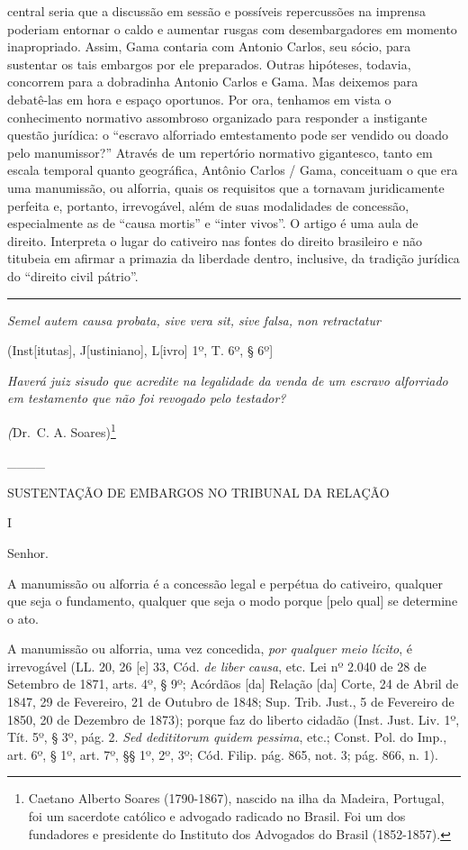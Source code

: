 {central seria que a discussão em sessão e possíveis repercussões na
imprensa poderiam entornar o caldo e aumentar rusgas com desembargadores
em momento inapropriado. Assim, Gama contaria com Antonio Carlos, seu
sócio, para sustentar os tais embargos por ele preparados. Outras
hipóteses, todavia, concorrem para a dobradinha Antonio Carlos e Gama.
Mas deixemos para debatê-las em hora e espaço oportunos. Por ora,
tenhamos em vista o conhecimento normativo assombroso organizado para
responder a instigante questão jurídica: o ``escravo alforriado
emtestamento pode ser vendido ou doado pelo manumissor?'' Através de um
repertório normativo gigantesco, tanto em escala temporal quanto
geográfica, Antônio Carlos / Gama, conceituam o que era uma manumissão,
ou alforria, quais os requisitos que a tornavam juridicamente perfeita
e, portanto, irrevogável, além de suas modalidades de concessão,
especialmente as de ``causa mortis'' e ``inter vivos''. O artigo é uma
aula de direito. Interpreta o lugar do cativeiro nas fontes do direito
brasileiro e não titubeia em afirmar a primazia da liberdade dentro,
inclusive, da tradição jurídica do ``direito civil pátrio''. }

\begin{center}\rule{0.5\linewidth}{\linethickness}\end{center}

\emph{Semel autem causa probata, sive vera sit, sive falsa, non
retractatur}

(Inst{[}itutas{]}, J{[}ustiniano{]}, L{[}ivro{]} 1º, T. 6º, § 6º{]}

\emph{Haverá juiz sisudo que acredite na legalidade da venda de um
escravo alforriado em testamento que não foi revogado pelo testador?}

\emph{(}Dr.~C. A. Soares)\footnote{Caetano Alberto Soares (1790-1867),
  nascido na ilha da Madeira, Portugal, foi um sacerdote católico e
  advogado radicado no Brasil. Foi um dos fundadores e presidente do
  Instituto dos Advogados do Brasil (1852-1857).}

\_\_\_\_

SUSTENTAÇÃO DE EMBARGOS NO TRIBUNAL DA RELAÇÃO

I

Senhor.

A manumissão ou alforria é a concessão legal e perpétua do cativeiro,
qualquer que seja o fundamento, qualquer que seja o modo porque {[}pelo
qual{]} se determine o ato.

A manumissão ou alforria, uma vez concedida, \emph{por qualquer meio
lícito}, é irrevogável (LL. 20, 26 {[}e{]} 33, Cód. \emph{de liber
causa}, etc. Lei nº 2.040 de 28 de Setembro de 1871, arts. 4º, § 9º;
Acórdãos {[}da{]} Relação {[}da{]} Corte, 24 de Abril de 1847, 29 de
Fevereiro, 21 de Outubro de 1848; Sup. Trib. Just., 5 de Fevereiro de
1850, 20 de Dezembro de 1873); porque faz do liberto cidadão (Inst.
Just. Liv. 1º, Tít. 5º, § 3º, pág. 2. \emph{Sed dedititorum quidem
pessima}, etc.; Const. Pol. do Imp., art. 6º, § 1º, art. 7º, §§ 1º, 2º,
3º; Cód. Filip. pág. 865, not. 3; pág. 866, n. 1).

